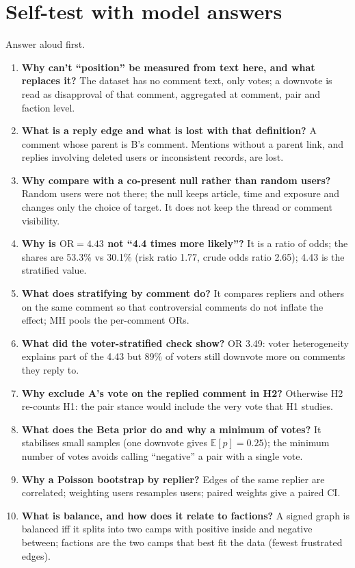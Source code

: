 \documentclass[11pt,a4paper]{article}
\newcommand{\OR}{\mathrm{OR}}
\newcommand{\E}{\mathbb{E}}
\begin{document}
\section{Self-test with model answers}\label{sec:selftest}
Answer aloud first.
\begin{enumerate}
\item \textbf{Why can't ``position'' be measured from text here, and what replaces it?} The dataset has no comment text, only votes; a downvote is read as disapproval of that comment, aggregated at comment, pair and faction level.
\item \textbf{What is a reply edge and what is lost with that definition?} A comment whose parent is B's comment. Mentions without a parent link, and replies involving deleted users or inconsistent records, are lost.
\item \textbf{Why compare with a co-present null rather than random users?} Random users were not there; the null keeps article, time and exposure and changes only the choice of target. It does not keep the thread or comment visibility.
\item \textbf{Why is $\OR=4.43$ not ``4.4 times more likely''?} It is a ratio of odds; the shares are 53.3\% vs 30.1\% (risk ratio 1.77, crude odds ratio 2.65); 4.43 is the stratified value.
\item \textbf{What does stratifying by comment do?} It compares repliers and others on the same comment so that controversial comments do not inflate the effect; MH pools the per-comment ORs.
\item \textbf{What did the voter-stratified check show?} OR 3.49: voter heterogeneity explains part of the 4.43 but 89\% of voters still downvote more on comments they reply to.
\item \textbf{Why exclude A's vote on the replied comment in H2?} Otherwise H2 re-counts H1: the pair stance would include the very vote that H1 studies.
\item \textbf{What does the Beta prior do and why a minimum of votes?} It stabilises small samples (one downvote gives $\E[p]=0.25$); the minimum number of votes avoids calling ``negative'' a pair with a single vote.
\item \textbf{Why a Poisson bootstrap by replier?} Edges of the same replier are correlated; weighting users resamples users; paired weights give a paired CI.
\item \textbf{What is balance, and how does it relate to factions?} A signed graph is balanced iff it splits into two camps with positive inside and negative between; factions are the two camps that best fit the data (fewest frustrated edges).

\end{enumerate}
\end{document}
